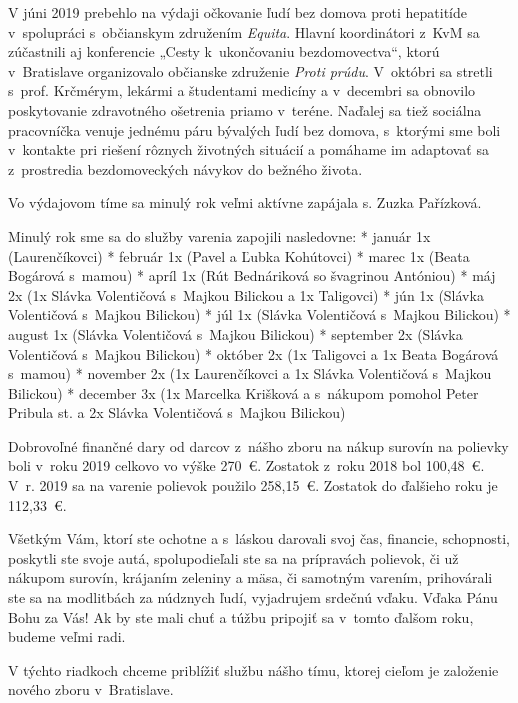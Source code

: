 V júni 2019 prebehlo na výdaji očkovanie ľudí bez domova proti hepatitíde v~spolupráci s~občianskym združením {\it Equita}. Hlavní koordinátori z~KvM sa zúčastnili aj konferencie „Cesty k~ukončovaniu bezdomovectva“, ktorú v~Bratislave organizovalo občianske združenie {\it Proti prúdu}. V~októbri sa stretli s~prof. Krčmérym, lekármi a študentami medicíny a v~decembri sa obnovilo poskytovanie zdravotného ošetrenia priamo v~teréne. Naďalej sa tiež sociálna pracovníčka venuje jednému páru bývalých ľudí bez domova, s~ktorými sme boli v~kontakte pri riešení rôznych životných situácií a pomáhame im adaptovať sa z~prostredia bezdomoveckých návykov do bežného života.

Vo výdajovom tíme sa minulý rok veľmi aktívne zapájala s. Zuzka Pařízková.

Minulý rok sme sa do služby varenia zapojili nasledovne:
\begitems
* január 1x (Laurenčíkovci)
* február 1x (Pavel a Ľubka Kohútovci)
* marec 1x (Beata Bogárová s~mamou)
* apríl 1x (Rút Bednáriková so švagrinou Antóniou)
* máj 2x (1x Slávka Volentičová s~Majkou Bilickou a 1x Taligovci)
* jún 1x (Slávka Volentičová s~Majkou Bilickou)
* júl 1x (Slávka Volentičová s~Majkou Bilickou)
* august 1x (Slávka Volentičová s~Majkou Bilickou)
* september 2x (Slávka Volentičová s~Majkou Bilickou)
* október 2x (1x Taligovci a 1x Beata Bogárová s~mamou)
* november 2x (1x Laurenčíkovci a 1x Slávka Volentičová s~Majkou Bilickou)
* december 3x (1x Marcelka Krišková a s~nákupom pomohol Peter Pribula st. a 2x Slávka Volentičová s~Majkou Bilickou)
\enditems

Dobrovoľné finančné dary od darcov z~nášho zboru na nákup surovín na polievky boli v~roku 2019 celkovo vo výške 270~€. Zostatok z~roku 2018 bol 100,48~€. V~r. 2019 sa na varenie polievok použilo 258,15~€. Zostatok do ďalšieho roku je 112,33~€.

Všetkým Vám, ktorí ste ochotne a s~láskou darovali svoj čas, financie, schopnosti, poskytli ste svoje autá, spolupodieľali ste sa na prípravách polievok, či už nákupom surovín, krájaním zeleniny a mäsa, či samotným varením, prihovárali ste sa na modlitbách za núdznych ľudí, vyjadrujem srdečnú vďaku. Vďaka Pánu Bohu za Vás! Ak by ste mali chuť a túžbu pripojiť sa v~tomto ďalšom roku, budeme veľmi radi.





V týchto riadkoch chceme priblížiť službu nášho tímu, ktorej cieľom je založenie nového zboru v~Bratislave.

